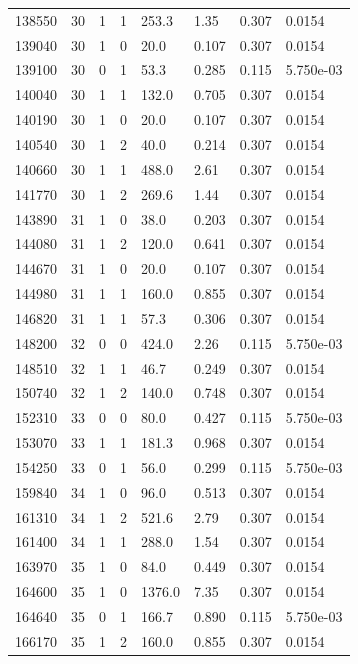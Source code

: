 \documentclass[preview]{standalone}
\begin{document}
{{{{{\begin{tabular}{L{1.2cm}C{1.2cm} C{0.3cm}C{0.5cm} C{1.4cm}C{1.4cm} C{1.4cm}C{1.4cm}}
  138550  &    30  & 1     &  1 &  253.3  & 1.35  & 0.307 &  0.0154   \\ 
  139040  &    30  & 1     &  0 &  20.0  & 0.107  & 0.307 &  0.0154   \\ 
  139100  &    30  & 0     &  1 &  53.3  & 0.285  & 0.115 &  5.750e-03   \\ 
  140040  &    30  & 1     &  1 &  132.0  & 0.705  & 0.307 &  0.0154   \\ 
  140190  &    30  & 1     &  0 &  20.0  & 0.107  & 0.307 &  0.0154   \\ 
  140540  &    30  & 1     &  2 &  40.0  & 0.214  & 0.307 &  0.0154   \\ 
  140660  &    30  & 1     &  1 &  488.0  & 2.61  & 0.307 &  0.0154   \\ 
  141770  &    30  & 1     &  2 &  269.6  & 1.44  & 0.307 &  0.0154   \\ 
  143890  &    31  & 1     &  0 &  38.0  & 0.203  & 0.307 &  0.0154   \\ 
  144080  &    31  & 1     &  2 &  120.0  & 0.641  & 0.307 &  0.0154   \\ 
  144670  &    31  & 1     &  0 &  20.0  & 0.107  & 0.307 &  0.0154   \\ 
  144980  &    31  & 1     &  1 &  160.0  & 0.855  & 0.307 &  0.0154   \\ 
  146820  &    31  & 1     &  1 &  57.3  & 0.306  & 0.307 &  0.0154   \\ 
  148200  &    32  & 0     &  0 &  424.0  & 2.26  & 0.115 &  5.750e-03   \\ 
  148510  &    32  & 1     &  1 &  46.7  & 0.249  & 0.307 &  0.0154   \\ 
  150740  &    32  & 1     &  2 &  140.0  & 0.748  & 0.307 &  0.0154   \\ 
  152310  &    33  & 0     &  0 &  80.0  & 0.427  & 0.115 &  5.750e-03   \\ 
  153070  &    33  & 1     &  1 &  181.3  & 0.968  & 0.307 &  0.0154   \\ 
  154250  &    33  & 0     &  1 &  56.0  & 0.299  & 0.115 &  5.750e-03   \\ 
  159840  &    34  & 1     &  0 &  96.0  & 0.513  & 0.307 &  0.0154   \\ 
  161310  &    34  & 1     &  2 &  521.6  & 2.79  & 0.307 &  0.0154   \\ 
  161400  &    34  & 1     &  1 &  288.0  & 1.54  & 0.307 &  0.0154   \\ 
  163970  &    35  & 1     &  0 &  84.0  & 0.449  & 0.307 &  0.0154   \\ 
  164600  &    35  & 1     &  0 &  1376.0  & 7.35  & 0.307 &  0.0154   \\ 
  164640  &    35  & 0     &  1 &  166.7  & 0.890  & 0.115 &  5.750e-03   \\ 
  166170  &    35  & 1     &  2 &  160.0  & 0.855  & 0.307 &  0.0154   \\ 
\hline 
\end{tabular} 

}}}}}
\end{document}

